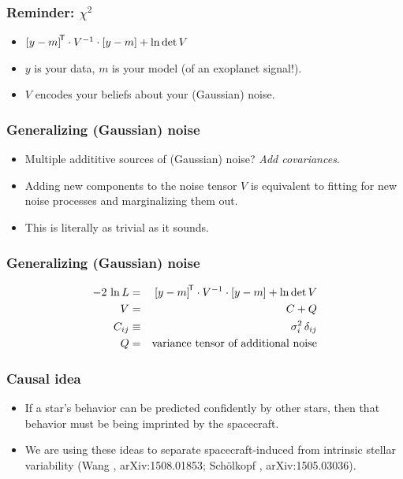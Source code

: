 \documentclass[pdftex]{beamer}
\begin{document}
\begin{frame}
  \frametitle{Reminder: $\chi^2$}
  \begin{itemize}
  \item ${[y - m]}^{\mathsf{\!T}}\cdot V^{-1}\cdot [y - m] + \ln\det V$
  \item $y$ is your data, $m$ is your model (of an exoplanet signal!).
  \item $V$ encodes your beliefs about your (Gaussian) noise.
  \end{itemize}
\end{frame}

\begin{frame}
  \frametitle{Generalizing (Gaussian) noise}
  \begin{itemize}
  \item Multiple addititive sources of (Gaussian) noise? \emph{Add covariances}.
  \item Adding new components to the noise tensor $V$ is
    equivalent to fitting for new noise processes and marginalizing
    them out.
  \item This is literally as trivial as it sounds.
  \end{itemize}
\end{frame}

\begin{frame}
  \frametitle{Generalizing (Gaussian) noise}
  \begin{eqnarray}
    -2\,\ln L &=& {[y - m]}^{\mathsf{\!T}}\cdot V^{-1}\cdot [y - m] + \ln\det V
    \nonumber \\
    V &=& C + Q
    \nonumber \\
    C_{ij} &\equiv& \sigma_i^2\,\delta_{ij}
    \nonumber \\
    Q &=& \mbox{variance tensor of additional noise}
    \nonumber
  \end{eqnarray}
\end{frame}

\begin{frame}
  \frametitle{Causal idea}
  \begin{itemize}
  \item If a star's behavior can be predicted confidently by
    other stars, then that behavior must be being imprinted by
    the spacecraft.
  \item We are using these ideas to separate spacecraft-induced from
    intrinsic stellar variability {\footnotesize (Wang \etal, arXiv:1508.01853;
    Sch\"olkopf \etal, arXiv:1505.03036)}.
  \end{itemize}
\end{frame}
\end{document}
